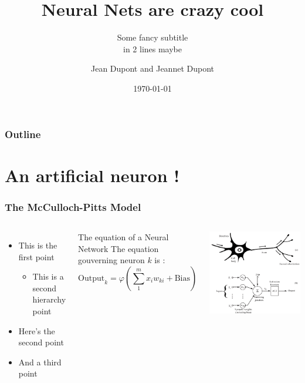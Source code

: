 \documentclass[10pt, aspectratio = 169]{beamer} %
\title{Neural Nets are crazy cool}
\subtitle{Some fancy subtitle \\ in 2 lines maybe} %
\author{Jean Dupont and Jeannet Dupont}
\date{\today} %
\begin{document}
\begin{frame}
    \titlepage
\end{frame}

\begin{frame}
    \frametitle{Outline}
    \tableofcontents
\end{frame}

\section{An artificial neuron !}
\begin{frame}
    \frametitle{The McCulloch-Pitts Model}
    \begin{columns}
	    	\begin{itemize}
	    	\pause
	    	\item This is the first point
		    	\begin{itemize}
		    		\item This is a second hierarchy point
		    	\end{itemize}
		    \pause
	    	\item Here's the second point
	    	\pause
	    	\item And a third point
	    	\end{itemize}
	    	\pause
	    	\begin{block}{The equation of a Neural Network}
	    		The equation gouverning neuron $k$ is :
	    		\[\text{Output}_k = \varphi(\sum_{1}^{m} x_i w_{ki} + \text{Bias})\]
	    	\end{block}
    	\centering \includegraphics[width=\textwidth]{images/artificial_neuron.png}
    \end{columns}
\end{frame}
\end{document}
